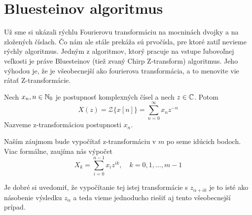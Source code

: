 \section{Bluesteinov algoritmus}

Už sme si ukázali rýchlu Fourierovu transformáciu na
mocninách dvojky a na zložených číslach. Čo nám ale stále
prekáža sú prvočísla, pre ktoré zatiľ nevieme rýchly algoritmus.
Jedným z algoritmov, ktorý pracuje na vstupe ľubovoľnej veľkosti
je práve Bluesteinov (tiež zvaný Chirp Z-transform) algoritmus.
Jeho výhodou je, že je všeobecnejší ako fourierova transformácia,
a to menovite vie rátať Z-transformácie.

\def\Ztransform{\mathcal{Z}}

\begin{definicia}
    Nech $x_n, n\in \mathbb{N}_0$ je postupnosť komplexných čísel a nech 
    $z\in\mathbb{C}$.
    Potom
    \begin{equation}
        X(z) = \Ztransform\{x[n]\} =
        \sum_{n=0}^{\infty} x_n z^{-n}
    \end{equation}
    Nazveme z-transformáciou postupnosti $x_n$.
\end{definicia}

Naším záujmom bude vypočítať z-transformáciu v $m$ po seme idúcich
bodoch.
Viac formálne, zaujíma nás výpočet
\begin{equation}
    X_k = \sum_{i=0}^{n-1} x_i z^{ik}, \quad k = 0,1,\dots,m-1
\end{equation}
\begin{poznamka}
    Je dobré si uvedomiť, že vypočítanie tej istej transformácie
    s $z_{\alpha + ik}$ je to isté ako násobenie výsledku
    $z_\alpha$ a teda vieme jednoducho riešiť aj tento všeobecnejší
    prípad.
\end{poznamka}

